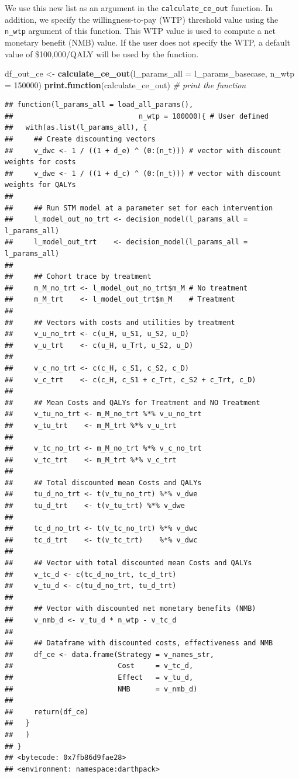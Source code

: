 \documentclass[]{book}
\newenvironment{Shaded}{\begin{snugshade}}{\end{snugshade}}
\newcommand{\KeywordTok}[1]{\textcolor[rgb]{0.13,0.29,0.53}{\textbf{#1}}}
\newcommand{\DataTypeTok}[1]{\textcolor[rgb]{0.13,0.29,0.53}{#1}}
\newcommand{\DecValTok}[1]{\textcolor[rgb]{0.00,0.00,0.81}{#1}}
\newcommand{\StringTok}[1]{\textcolor[rgb]{0.31,0.60,0.02}{#1}}
\newcommand{\CommentTok}[1]{\textcolor[rgb]{0.56,0.35,0.01}{\textit{#1}}}
\newcommand{\NormalTok}[1]{#1}
\begin{document}
We use this new list as an argument in the \texttt{calculate\_ce\_out}
function. In addition, we specify the willingness-to-pay (WTP) threshold
value using the \texttt{n\_wtp} argument of this function. This WTP
value is used to compute a net monetary benefit (NMB) value. If the user
does not specify the WTP, a default value of \$100,000/QALY will be used
by the function.

\begin{Shaded}
\begin{Highlighting}[]
\NormalTok{df_out_ce <-}\StringTok{ }\KeywordTok{calculate_ce_out}\NormalTok{(}\DataTypeTok{l_params_all =}\NormalTok{ l_params_basecase, }
                                \DataTypeTok{n_wtp =} \DecValTok{150000}\NormalTok{)}
\KeywordTok{print.function}\NormalTok{(calculate_ce_out) }\CommentTok{# print the function}
\end{Highlighting}
\end{Shaded}

\begin{verbatim}
## function(l_params_all = load_all_params(), 
##                              n_wtp = 100000){ # User defined
##   with(as.list(l_params_all), {
##     ## Create discounting vectors
##     v_dwc <- 1 / ((1 + d_e) ^ (0:(n_t))) # vector with discount weights for costs
##     v_dwe <- 1 / ((1 + d_c) ^ (0:(n_t))) # vector with discount weights for QALYs
##     
##     ## Run STM model at a parameter set for each intervention
##     l_model_out_no_trt <- decision_model(l_params_all = l_params_all)
##     l_model_out_trt    <- decision_model(l_params_all = l_params_all)
##     
##     ## Cohort trace by treatment
##     m_M_no_trt <- l_model_out_no_trt$m_M # No treatment
##     m_M_trt    <- l_model_out_trt$m_M    # Treatment
##     
##     ## Vectors with costs and utilities by treatment
##     v_u_no_trt <- c(u_H, u_S1, u_S2, u_D)
##     v_u_trt    <- c(u_H, u_Trt, u_S2, u_D)
##     
##     v_c_no_trt <- c(c_H, c_S1, c_S2, c_D)
##     v_c_trt    <- c(c_H, c_S1 + c_Trt, c_S2 + c_Trt, c_D)
##     
##     ## Mean Costs and QALYs for Treatment and NO Treatment
##     v_tu_no_trt <- m_M_no_trt %*% v_u_no_trt
##     v_tu_trt    <- m_M_trt %*% v_u_trt
##     
##     v_tc_no_trt <- m_M_no_trt %*% v_c_no_trt
##     v_tc_trt    <- m_M_trt %*% v_c_trt
##     
##     ## Total discounted mean Costs and QALYs
##     tu_d_no_trt <- t(v_tu_no_trt) %*% v_dwe 
##     tu_d_trt    <- t(v_tu_trt) %*% v_dwe
##     
##     tc_d_no_trt <- t(v_tc_no_trt) %*% v_dwc
##     tc_d_trt    <- t(v_tc_trt)    %*% v_dwc
##     
##     ## Vector with total discounted mean Costs and QALYs
##     v_tc_d <- c(tc_d_no_trt, tc_d_trt)
##     v_tu_d <- c(tu_d_no_trt, tu_d_trt)
##     
##     ## Vector with discounted net monetary benefits (NMB)
##     v_nmb_d <- v_tu_d * n_wtp - v_tc_d
##     
##     ## Dataframe with discounted costs, effectiveness and NMB
##     df_ce <- data.frame(Strategy = v_names_str,
##                         Cost     = v_tc_d,
##                         Effect   = v_tu_d,
##                         NMB      = v_nmb_d)
##     
##     return(df_ce)
##   }
##   )
## }
## <bytecode: 0x7fb86d9fae28>
## <environment: namespace:darthpack>
\end{verbatim}
\end{document}
